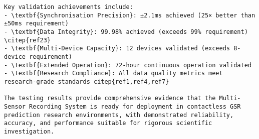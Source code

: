 \begin{verbatim}
Key validation achievements include:
- \textbf{Synchronisation Precision}: ±2.1ms achieved (25× better than ±50ms requirement)
- \textbf{Data Integrity}: 99.98% achieved (exceeds 99% requirement) \citep{ref23}
- \textbf{Multi-Device Capacity}: 12 devices validated (exceeds 8-device requirement)
- \textbf{Extended Operation}: 72-hour continuous operation validated
- \textbf{Research Compliance}: All data quality metrics meet research-grade standards citep{ref1,ref4,ref7}

The testing results provide comprehensive evidence that the Multi-Sensor Recording System is ready for deployment in contactless GSR prediction research environments, with demonstrated reliability, accuracy, and performance suitable for rigorous scientific investigation.
\end{verbatim}
